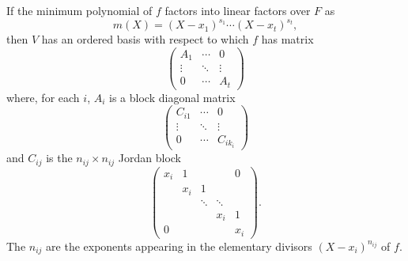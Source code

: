If the minimum polynomial of $f$ factors into linear factors over $F$ as
$$m(X) = (X - x_1)^{s_1} \cdots (X - x_t)^{s_t},$$
then $V$ has an ordered basis with respect to which $f$ has matrix
$$\begin{pmatrix}
A_1 & \cdots & 0 \\
\vdots & \ddots & \vdots \\
0 & \cdots & A_t
\end{pmatrix}$$
where, for each $i$, $A_i$ is a block diagonal matrix
$$\begin{pmatrix}
C_{i1} & \cdots & 0 \\
\vdots & \ddots & \vdots \\
0 & \cdots & C_{ik_i}
\end{pmatrix}$$
and $C_{ij}$ is the $n_{ij} \times n_{ij}$ Jordan block
$$\begin{pmatrix}
x_i & 1 & & & 0 \\
& x_i & 1 & & \\
& & \ddots & \ddots & \\
& & & x_i & 1 \\
0 & & & & x_i
\end{pmatrix}.$$
The $n_{ij}$ are the exponents appearing in the elementary divisors $(X - x_i)^{n_{ij}}$ of $f$.
